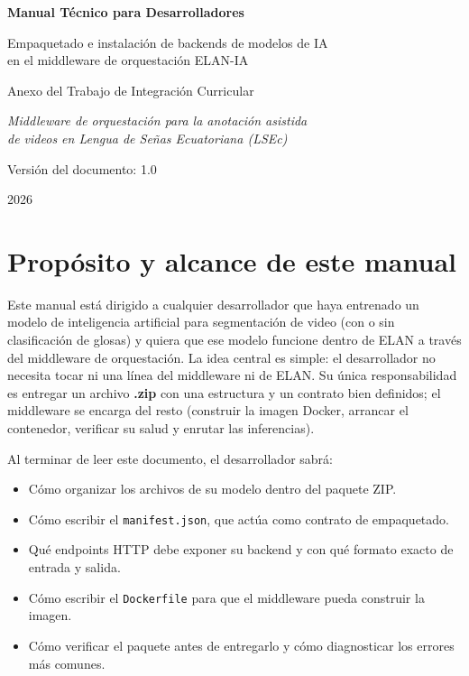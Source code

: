 \documentclass[12pt,a4paper]{article}
\begin{document}
\begin{titlepage}
\centering
\vspace*{3cm}
{\LARGE \textbf{Manual Técnico para Desarrolladores}\par}
\vspace{0.6cm}
{\Large Empaquetado e instalación de backends de modelos de IA\\
en el middleware de orquestación ELAN-IA\par}
\vspace{2cm}
{\large Anexo del Trabajo de Integración Curricular\par}
\vspace{0.4cm}
{\large \textit{Middleware de orquestación para la anotación asistida\\
de videos en Lengua de Señas Ecuatoriana (LSEc)}\par}
\vfill
{\large Versión del documento: 1.0\par}
\vspace{0.3cm}
{\large 2026\par}
\end{titlepage}

\tableofcontents
\newpage

\section{Propósito y alcance de este manual}

Este manual está dirigido a cualquier desarrollador que haya entrenado un modelo de inteligencia artificial para segmentación de video (con o sin clasificación de glosas) y quiera que ese modelo funcione dentro de ELAN a través del middleware de orquestación. La idea central es simple: el desarrollador no necesita tocar ni una línea del middleware ni de ELAN. Su única responsabilidad es entregar un archivo \textbf{.zip} con una estructura y un contrato bien definidos; el middleware se encarga del resto (construir la imagen Docker, arrancar el contenedor, verificar su salud y enrutar las inferencias).

Al terminar de leer este documento, el desarrollador sabrá:

\begin{itemize}[noitemsep, topsep=2pt]
    \item Cómo organizar los archivos de su modelo dentro del paquete ZIP.
    \item Cómo escribir el \texttt{manifest.json}, que actúa como contrato de empaquetado.
    \item Qué endpoints HTTP debe exponer su backend y con qué formato exacto de entrada y salida.
    \item Cómo escribir el \texttt{Dockerfile} para que el middleware pueda construir la imagen.
    \item Cómo verificar el paquete antes de entregarlo y cómo diagnosticar los errores más comunes.
\end{itemize}
\end{document}
